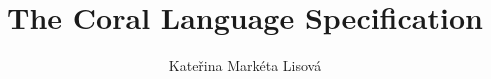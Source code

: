\documentclass[12pt,a4paper,twoside,titlepage]{book}
\begin{document}
\frontmatter
\title{The Coral Language Specification}
\author{Kateřina Markéta Lisová}
\maketitle
\clearemptydoublepage
\tableofcontents

\mainmatter
\sloppy



\appendix

\end{document}
